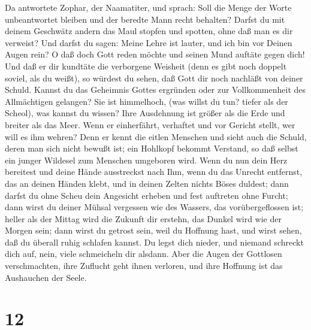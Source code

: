  Da antwortete Zophar, der Naamatiter, und sprach:
 Soll die Menge der Worte unbeantwortet bleiben und der
beredte Mann recht behalten?  Darfst du mit deinem
Geschwätz andern das Maul stopfen und spotten, ohne daß man es dir
verweist?  Und darfst du sagen: Meine Lehre ist lauter,
und ich bin vor Deinen Augen rein?  O daß doch Gott reden
möchte und seinen Mund auftäte gegen dich!  Und daß er dir
kundtäte die verborgene Weisheit (denn es gibt noch doppelt soviel, als
du weißt), so würdest du sehen, daß Gott dir noch nachläßt von deiner
Schuld.  Kannst du das Geheimnis Gottes ergründen oder zur
Vollkommenheit des Allmächtigen gelangen?  Sie ist
himmelhoch, (was willst du tun? tiefer als der Scheol), was kannst du
wissen?  Ihre Ausdehnung ist größer als die Erde und
breiter als das Meer.  Wenn er einherfährt, verhaftet und
vor Gericht stellt, wer will es ihm wehren?  Denn er
kennt die eitlen Menschen und sieht auch die Schuld, deren man sich
nicht bewußt ist;  ein Hohlkopf bekommt Verstand, so daß
selbst ein junger Wildesel zum Menschen umgeboren wird. 
Wenn du nun dein Herz bereitest und deine Hände ausstreckst nach Ihm,
 wenn du das Unrecht entfernst, das an deinen Händen
klebt, und in deinen Zelten nichts Böses duldest;  dann
darfst du ohne Scheu dein Angesicht erheben und fest auftreten ohne
Furcht;  dann wirst du deiner Mühsal vergessen wie des
Wassers, das vorübergeflossen ist;  heller als der Mittag
wird die Zukunft dir erstehn, das Dunkel wird wie der Morgen sein;
 dann wirst du getrost sein, weil du Hoffnung hast, und
wirst sehen, daß du überall ruhig schlafen kannst.  Du
legst dich nieder, und niemand schreckt dich auf, nein, viele
schmeicheln dir alsdann.  Aber die Augen der Gottlosen
verschmachten, ihre Zuflucht geht ihnen verloren, und ihre Hoffnung ist
das Aushauchen der Seele.

\hypertarget{section-11}{%
\section{12}\label{section-11}}

